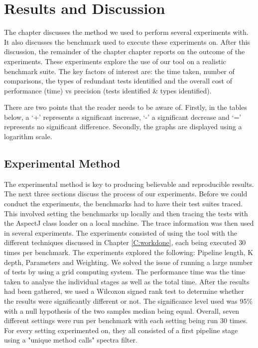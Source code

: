 \chapter{Results and Discussion}\label{C:results}\label{C:evaluation}

 The chapter discusses the method we used to perform several experiments with. It also discusses the benchmark used to execute these experiments on. After this discussion, the remainder of the chapter chapter reports on the outcome of the experiments. These experiments explore the use of our tool on a realistic benchmark suite. The key factors of interest are: the time taken, number of comparisons, the types of redundant tests identified and the overall cost of performance (time) vs precision (tests identified \& types identified).

There are two points that the reader needs to be aware of. Firstly, in the tables below, a `+' represents a significant increase, `-' a significant decrease and `=' represents no significant difference. Secondly, the graphs are displayed using a logarithm scale.

\section{Experimental Method}

The experimental method is key to producing believable and reproducible results. The next three sections discuss the process of our experiments. Before we could conduct the experiments, the benchmarks had to have their test suites traced. This involved setting the benchmarks up locally and then tracing the tests with the AspectJ class loader on a local machine. The trace information was then used in several experiments. The experiments consisted of using the tool with the different techniques discussed in Chapter \ref{C:workdone}, each being executed 30 times per benchmark. The experiments explored the following: Pipeline length, K depth, Parameters and Weighting. We solved the issue of running a large number of tests by using a grid computing system. The performance time was the time taken to analyse the individual stages as well as the total time. After the results had been gathered, we used a Wilcoxon signed rank test \cite{wilcoxon1945individual} to determine whether the results were significantly different or not. The significance level used was 95\% with a null hypothesis of the two samples median being equal. Overall, seven different settings were run per benchmark with each setting being run 30 times. For every setting experimented on, they all consisted of a first pipeline stage using a "unique method calls" spectra filter. 

